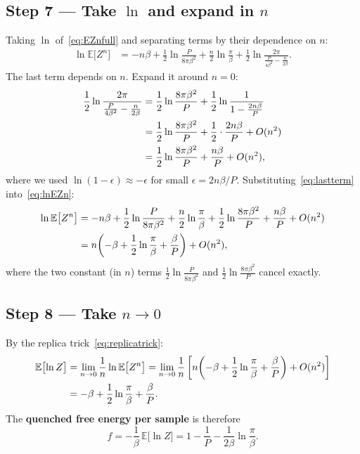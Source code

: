 \documentclass[nobib,justified]{tufte-handout}
\newcommand{\EE}{\mathbb{E}}
\begin{document}
\subsection*{Step 7 --- Take $\ln$ and expand in $n$}

Taking $\ln$ of~\eqref{eq:EZnfull} and separating terms by their
dependence on $n$:
\begin{align}
  \ln\EE\bigl[Z^n\bigr]
  &= -n\beta
    + \frac{1}{2}\ln\frac{P}{8\pi\beta^2}
    + \frac{n}{2}\ln\frac{\pi}{\beta}
    + \frac{1}{2}\ln\frac{2\pi}{\frac{P}{4\beta^2}-\frac{n}{2\beta}}.
  \label{eq:lnEZn}
\end{align}
The last term depends on $n$.  Expand it around $n=0$:
\begin{align}
  \frac{1}{2}\ln\frac{2\pi}{\frac{P}{4\beta^2}-\frac{n}{2\beta}}
  &= \frac{1}{2}\ln\frac{8\pi\beta^2}{P}
    + \frac{1}{2}\ln\frac{1}{1-\frac{2n\beta}{P}} \notag\\
  &= \frac{1}{2}\ln\frac{8\pi\beta^2}{P}
    + \frac{1}{2}\cdot\frac{2n\beta}{P}
    + O(n^2) \notag\\
  &= \frac{1}{2}\ln\frac{8\pi\beta^2}{P}
    + \frac{n\beta}{P}
    + O(n^2),
  \label{eq:lastterm}
\end{align}
where we used $\ln(1-\epsilon)\approx -\epsilon$ for small
$\epsilon=2n\beta/P$.  Substituting~\eqref{eq:lastterm}
into~\eqref{eq:lnEZn}:
\begin{align}
  \ln\EE\bigl[Z^n\bigr]
  &= -n\beta
    + \frac{1}{2}\ln\frac{P}{8\pi\beta^2}
    + \frac{n}{2}\ln\frac{\pi}{\beta}
    + \frac{1}{2}\ln\frac{8\pi\beta^2}{P}
    + \frac{n\beta}{P}
    + O(n^2) \notag\\
  &= n\!\left(-\beta + \frac{1}{2}\ln\frac{\pi}{\beta}
    + \frac{\beta}{P}\right)
    + O(n^2),
  \label{eq:lnEZnexpand}
\end{align}
where the two constant (in $n$) terms $\frac{1}{2}\ln\frac{P}{8\pi\beta^2}$
and $\frac{1}{2}\ln\frac{8\pi\beta^2}{P}$ cancel exactly.

\subsection*{Step 8 --- Take $n\to 0$}

By the replica trick~\eqref{eq:replicatrick}:
\begin{align}
  \EE\bigl[\ln Z\bigr]
  &= \lim_{n\to 0}\frac{1}{n}\ln\EE\bigl[Z^n\bigr]
   = \lim_{n\to 0}\frac{1}{n}\left[
      n\!\left(-\beta + \frac{1}{2}\ln\frac{\pi}{\beta}
      + \frac{\beta}{P}\right) + O(n^2)
    \right] \notag\\
  &= -\beta + \frac{1}{2}\ln\frac{\pi}{\beta} + \frac{\beta}{P}.
  \label{eq:ElnZ}
\end{align}
The \textbf{quenched free energy per sample} is therefore
\begin{equation}
  \boxed{f = -\frac{1}{\beta}\,\EE\bigl[\ln Z\bigr]
    = 1 - \frac{1}{P} - \frac{1}{2\beta}\ln\frac{\pi}{\beta}.}
  \label{eq:freeenergy}
\end{equation}
\end{document}
